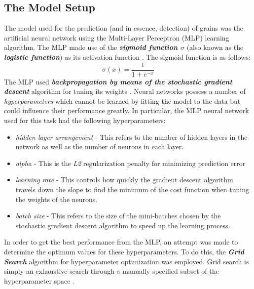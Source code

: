 \subsection{The Model Setup}
The model used for the prediction (and in essence, detection) of grains was the artificial neural network using the Multi-Layer Perceptron (MLP) learning algorithm. The MLP made use of the \textit{\textbf{sigmoid function $\sigma$}} (also known as the \textbf{\textit{logistic function}}) as its activation function \cite{REF28}. The sigmoid function is as follows:
\begin{equation}
\sigma(x) = \frac{1}{1 + e^{-x}}
\end{equation}
The MLP used \textit{\textbf{backpropagation by means of the stochastic gradient descent}} algorithm for tuning its weights \cite{REF29}. Neural networks possess a number of \textit{hyperparameters} which cannot be learned by fitting the model to the data but could influence their performance greatly. In particular, the MLP neural network used for this task had the following hyperparameters:
\begin{itemize}
\item \textit{hidden layer arrangement} - This refers to the number of hidden layers in the network as well as the number of neurons in each layer.
\item \textit{alpha} - This is the \textit{L2} regularization penalty for minimizing prediction error
\item \textit{learning rate} - This controls how quickly the gradient descent algorithm travels down the slope to find the minimum of the cost function when tuning the weights of the neurons.
\item \textit{batch size} - This refers to the size of the mini-batches chosen by the stochastic gradient descent algorithm to speed up the learning process.
\end{itemize}
In order to get the best performance from the MLP, an attempt was made to determine the optimum values for these hyperparameters. To do this, the \textit{\textbf{Grid Search}} algorithm for hyperparameter optimization was employed. Grid search is simply an exhaustive search through a manually specified subset of the hyperparameter space \cite{REF30}.

